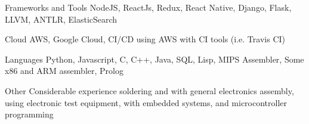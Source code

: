 
\begin{cvskills}
  \vspace{2mm}
  \cvskill
    {Frameworks and Tools}
    {NodeJS, ReactJs, Redux, React Native, Django, Flask, LLVM, ANTLR, ElasticSearch}

  \vspace{2mm}
  \cvskill
    {Cloud}
    {AWS, Google Cloud, CI/CD using AWS with CI tools (i.e. Travis CI)}

  \vspace{2mm}
  \cvskill
    {Languages} %
    {Python, Javascript, C, C++, Java, SQL, Lisp, MIPS Assembler, Some x86 and ARM assembler, Prolog}

  \vspace{2mm}
  \cvskill
    {Other}
    {Considerable experience soldering and with general electronics assembly, using electronic test equipment, with\newline
    embedded systems, and microcontroller programming}
\end{cvskills}
